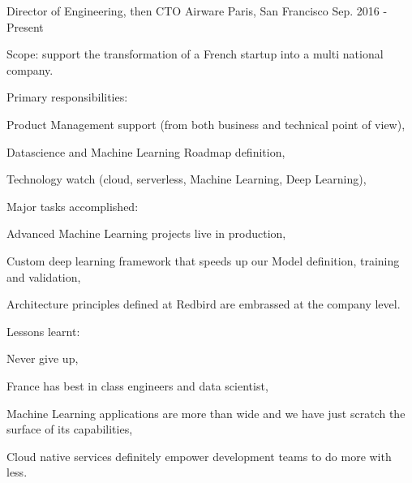 \begin{cventries}
  \cventry
    {Director of Engineering, then CTO} %
    {Airware} %
    {Paris, San Francisco} %
    {Sep. 2016 - Present} %
    {
      \begin{cvitems} %
        \item {Scope: support the transformation of a French startup into a multi national company.}
        \item {Primary responsibilities:}
        \begin{cvsubitems}
          \item {Product Management support (from both business and technical point of view),}
          \item {Datascience and Machine Learning Roadmap definition,}
          \item {Technology watch (cloud, serverless, Machine Learning, Deep Learning),}
        \end{cvsubitems}
        \item {Major tasks accomplished:}
        \begin{cvsubitems}
          \item {Advanced Machine Learning projects live in production,}
          \item {Custom deep learning framework that speeds up our Model definition, training and validation,}
          \item {Architecture principles defined at Redbird are embrassed at the company level.}
        \end{cvsubitems}
        \item {Lessons learnt:}
        \begin{cvsubitems}
          \item {Never give up,}
          \item {France has best in class engineers and data scientist,}
          \item {Machine Learning applications are more than wide and we have just scratch the surface of its capabilities,}
          \item {Cloud native services definitely empower development teams to do more with less.}
        \end{cvsubitems}
      \end{cvitems}
    }


\end{cventries}
